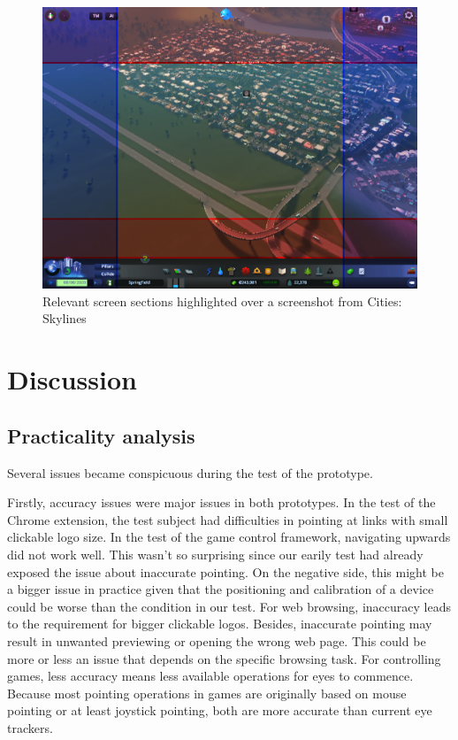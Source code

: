 \documentclass[english]{tktltiki}
\begin{document}
\begin{figure}[h]
\begin{center}
\includegraphics[width=1\textwidth]{cities_skylines.png}
\caption{Relevant screen sections highlighted over a screenshot from Cities: Skylines}
\label{citiesskylines}
\end{center}
\end{figure}



\section{Discussion}

\subsection{Practicality analysis}

Several issues became conspicuous during the test of the prototype. 

Firstly, accuracy issues were major issues in both prototypes. In the test of the Chrome extension, the test subject had difficulties in pointing at links with small clickable logo size. In the test of the game control framework, navigating upwards did not work well. This wasn't so surprising since our earily test had already exposed the issue about inaccurate pointing. On the negative side, this might be a bigger issue in practice given that the positioning and calibration of a device could be worse than the condition in our test. For web browsing, inaccuracy leads to the requirement for bigger clickable logos. Besides, inaccurate pointing may result in unwanted previewing or opening the wrong web page. This could be more or less an issue that depends on the specific browsing task. For controlling games, less accuracy means less available operations for eyes to commence. Because most pointing operations in games are originally based on mouse pointing or at least joystick pointing, both are more accurate than current eye trackers.
\end{document}
